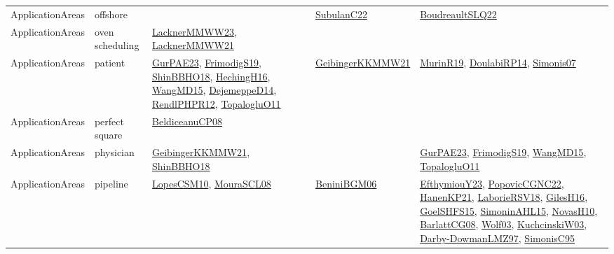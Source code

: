 {\begin{longtable}{llp{6cm}p{6cm}p{6cm}}
ApplicationAreas & offshore &  & \href{articles/SubulanC22.pdf}{SubulanC22}\cite{SubulanC22} & \href{papers/BoudreaultSLQ22.pdf}{BoudreaultSLQ22}\cite{BoudreaultSLQ22}\\
ApplicationAreas & oven scheduling & \href{articles/LacknerMMWW23.pdf}{LacknerMMWW23}\cite{LacknerMMWW23}, \href{papers/LacknerMMWW21.pdf}{LacknerMMWW21}\cite{LacknerMMWW21} &  & \\
ApplicationAreas & patient & \href{articles/GurPAE23.pdf}{GurPAE23}\cite{GurPAE23}, \href{papers/FrimodigS19.pdf}{FrimodigS19}\cite{FrimodigS19}, \href{articles/ShinBBHO18.pdf}{ShinBBHO18}\cite{ShinBBHO18}, \href{papers/HechingH16.pdf}{HechingH16}\cite{HechingH16}, \href{articles/WangMD15.pdf}{WangMD15}\cite{WangMD15}, \href{papers/DejemeppeD14.pdf}{DejemeppeD14}\cite{DejemeppeD14}, \href{papers/RendlPHPR12.pdf}{RendlPHPR12}\cite{RendlPHPR12}, \href{articles/TopalogluO11.pdf}{TopalogluO11}\cite{TopalogluO11} & \href{papers/GeibingerKKMMW21.pdf}{GeibingerKKMMW21}\cite{GeibingerKKMMW21} & \href{papers/MurinR19.pdf}{MurinR19}\cite{MurinR19}, \href{papers/DoulabiRP14.pdf}{DoulabiRP14}\cite{DoulabiRP14}, \href{articles/Simonis07.pdf}{Simonis07}\cite{Simonis07}\\
ApplicationAreas & perfect square & \href{papers/BeldiceanuCP08.pdf}{BeldiceanuCP08}\cite{BeldiceanuCP08} &  & \\
ApplicationAreas & physician & \href{papers/GeibingerKKMMW21.pdf}{GeibingerKKMMW21}\cite{GeibingerKKMMW21}, \href{articles/ShinBBHO18.pdf}{ShinBBHO18}\cite{ShinBBHO18} &  & \href{articles/GurPAE23.pdf}{GurPAE23}\cite{GurPAE23}, \href{papers/FrimodigS19.pdf}{FrimodigS19}\cite{FrimodigS19}, \href{articles/WangMD15.pdf}{WangMD15}\cite{WangMD15}, \href{articles/TopalogluO11.pdf}{TopalogluO11}\cite{TopalogluO11}\\
ApplicationAreas & pipeline & \href{articles/LopesCSM10.pdf}{LopesCSM10}\cite{LopesCSM10}, \href{papers/MouraSCL08.pdf}{MouraSCL08}\cite{MouraSCL08} & \href{papers/BeniniBGM06.pdf}{BeniniBGM06}\cite{BeniniBGM06} & \href{papers/EfthymiouY23.pdf}{EfthymiouY23}\cite{EfthymiouY23}, \href{papers/PopovicCGNC22.pdf}{PopovicCGNC22}\cite{PopovicCGNC22}, \href{papers/HanenKP21.pdf}{HanenKP21}\cite{HanenKP21}, \href{articles/LaborieRSV18.pdf}{LaborieRSV18}\cite{LaborieRSV18}, \href{papers/GilesH16.pdf}{GilesH16}\cite{GilesH16}, \href{articles/GoelSHFS15.pdf}{GoelSHFS15}\cite{GoelSHFS15}, \href{articles/SimoninAHL15.pdf}{SimoninAHL15}\cite{SimoninAHL15}, \href{articles/NovasH10.pdf}{NovasH10}\cite{NovasH10}, \href{papers/BarlattCG08.pdf}{BarlattCG08}\cite{BarlattCG08}, \href{papers/Wolf03.pdf}{Wolf03}\cite{Wolf03}, \href{articles/KuchcinskiW03.pdf}{KuchcinskiW03}\cite{KuchcinskiW03}, \href{articles/Darby-DowmanLMZ97.pdf}{Darby-DowmanLMZ97}\cite{Darby-DowmanLMZ97}, \href{papers/SimonisC95.pdf}{SimonisC95}\cite{SimonisC95}\\

\end{longtable}}
